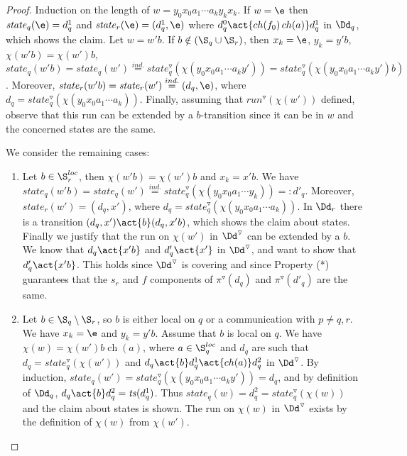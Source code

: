 \documentclass[10pt,a4paper]{article}
\newcommand{\run}{\mathit{run}}
\newcommand{\ts}{\mathit{ts}}
\newcommand{\red}[1]{#1^\triangledown}
\newcommand{\Sloc}{\S^{loc}}
\newcommand{\state}{\mathit{state}}
\newcommand{\ch}{\mathop{ch}}
\begin{document}
\begin{proof}
  Induction on the length of $w=y_0x_0a_1 \cdots a_ky_kx_k$. If $w=\e$
  then $\state_q(\e)=d^1_q$ and $\state_r(\e)=(d^1_q,\e)$ where $d^0_q
  \act{\ch(f_0) \ch(a)} d^1_q$ in $\Dd_q$, which shows the claim. Let
  $w=w'b$. If $b \notin (\S_q\cup \S_r)$, then $x_k=\e$, $y_k=y'b$,
  $\chi(w'b)=\chi(w')b$,
  $\state_q(w'b)=\state_q(w')\stackrel{ind.}{=}\red\state_q(\chi(y_0x_0a_1
  \cdots a_ky'))=\red\state_q(\chi(y_0x_0a_1 \cdots
  a_ky')b)$. Moreover,
  $\state_r(w'b)=\state_r(w')\stackrel{ind.}{=}(d_q,\e)$, where
  $d_q=\red\state_q(\chi(y_0x_0a_1 \cdots a_k))$. Finally, assuming
  that $\red\run(\chi(w'))$ defined, observe that this run can be extended by a
  $b$-transition since it can be in $w$ and the concerned states are
  the same.

We consider the remaining cases:
\begin{enumerate}
\item Let $b \in \Sloc_r$, then $\chi(w'b)=\chi(w')b$ and $x_k=x'b$. We have
  $\state_q(w'b)=\state_q(w')\stackrel{ind.}{=}\red\state_q(\chi(y_0x_0a_1
  \cdots y_k))=: d'_q$.
 Moreover, $\state_r(w')=(d_q,x')$, where
 $d_q=\red\state_q(\chi(y_0x_0a_1 \cdots a_k))$. In
 $\Dd_r$ there is a transition $(d_q,x') \act{b} (d_q,x'b)$, which
 shows the claim about states. Finally we justify that the run on $\chi(w')$ 
 in $\red\Dd$ can be extended by a $b$.  We know that $d_q \act{x'b}$
 and $d'_q \act{x'}$
 in $\red\Dd$, and want to show that $d'_q \act{x'b}$. This holds
 since $\red\Dd$ is covering and since Property (*) guarantees that
 the $s_r$ and $f$ components of $\red\pi(d_q)$ and $\red\pi(d'_q)$ are
 the same.
\item Let $b \in \S_q \setminus \S_r$, so $b$ is either local on $q$
  or a communication with $p \not= q,r$. We have $x_k=\e$ and
  $y_k=y'b$. Assume that $b$ is local on $q$. We have
  $\chi(w)=\chi(w')b \ch(a)$, where $a \in \Sloc_q$ and $d_q$ are such
  that $d_q=\red\state_q(\chi(w'))$ and $d_q \act{b} d^1_q
  \act{\ch(a)}d^2_q$ in $\red\Dd$. By induction,
  $\state_q(w')=\red\state_q(\chi(y_0x_0a_1 \cdots a_ky'))=d_q$, and
  by definition of $\Dd_q$, $d_q \act{b} d^2_q=\ts(d^1_q)$.  Thus
  $\state_q(w)=d^2_q=\red\state_q(\chi(w))$ and the claim about states
  is shown. The run  on $\chi(w)$ in $\red\Dd$ exists by the definition
  of $\chi(w)$ from $\chi(w')$.


\end{enumerate}
\end{proof}
\end{document}
